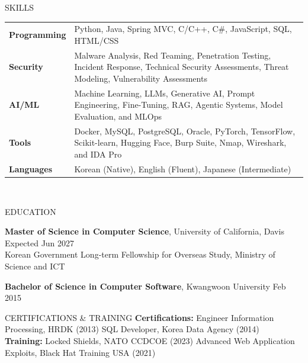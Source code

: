 \documentclass{resume}
\begin{document}
\begin{rSection}{SKILLS}
\begin{tabular}{ @{} >{\bfseries}l @{\hspace{2ex}} p{} }
Programming & Python, Java, Spring MVC, C/C++, C\#, JavaScript, SQL, HTML/CSS \\
Security & Malware Analysis, Red Teaming, Penetration Testing, Incident Response, Technical Security Assessments, Threat Modeling, Vulnerability Assessments \\
AI/ML & Machine Learning, LLMs, Generative AI, Prompt Engineering, Fine-Tuning, RAG, Agentic Systems, Model Evaluation, and MLOps \\
Tools & Docker, MySQL, PostgreSQL, Oracle, PyTorch, TensorFlow, Scikit-learn, Hugging Face, Burp Suite, Nmap, Wireshark, and IDA Pro \\
Languages & Korean (Native), English (Fluent), Japanese (Intermediate) \\
\end{tabular}\\
\end{rSection}

\begin{rSection}{EDUCATION}

{\bf Master of Science in Computer Science}, University of California, Davis \hfill {Expected Jun 2027}\\
Korean Government Long-term Fellowship for Overseas Study, Ministry of Science and ICT

{\bf Bachelor of Science in Computer Software}, Kwangwoon University \hfill {Feb 2015}

\end{rSection}

\begin{rSection}{CERTIFICATIONS \& TRAINING}
\textbf{Certifications:} Engineer Information Processing, HRDK (2013) \quad SQL Developer, Korea Data Agency (2014) \\
\textbf{Training:} Locked Shields, NATO CCDCOE (2023) \quad Advanced Web Application Exploits, Black Hat Training USA (2021)
\end{rSection}
\end{document}
